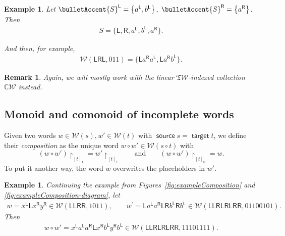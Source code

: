 \documentclass[pdftex]{sigma}
\renewcommand{\restriction}[2]{{#1\mathbin{\upharpoonright}_{#2}}}
\newcommand{\linearspan}[1]{{\CC #1}}
\newcommand{\SWc}{{\mathfrak{T}\mathcal{W}}}
\newcommand\IWc{\mathcal{W}}
\DeclareMathOperator{\source}{\mathsf{source}}
\DeclareMathOperator{\target}{\mathsf{target}}
\newcommand\LL{{\mathsf{L}}}
\newcommand\RR{{\mathsf{R}}}
\def\CC{\mathbb{C}}
\numberwithin{equation}{section}
\newtheorem{Example}[Theorem]{Example}
\newtheorem{Remark}[Theorem]{Remark}
\begin{document}
\begin{Example}
 Let $\bulletAccent{S}^{\LL} = \big\{a^\LL, b^\LL \big\}$, $\bulletAccent{S}^{\RR} = \big\{a^\RR\big\}$.
 Then
 \begin{align*}
 S = \big\{\LL,\RR,a^\LL,b^\LL,a^\RR\big\}.
 \end{align*}

 And then, for example,
 \begin{align*}
 \IWc( \LL\RR\LL,011 )
 =
 \big\{ \LL a^\RR a^\LL, \LL a^\RR b^\LL \big\}.
 \end{align*}
\end{Example}

\begin{Remark}
Again, we will mostly work with the linear $\SWc$-indexed collection $\linearspan{\IWc}$ instead.
\end{Remark}

\subsection{Monoid and comonoid of incomplete words}\label{ss:DmonoidDcomonoid}

Given two words $w\in\IWc{(s)},w'\in\IWc{(t)}$ with $\source s=\target t$, we define their \textit{composition} as the unique word $w\circ w'\in \IWc(s\circ t)$ with \[\restriction{(w\circ w')}{[t]_1}=\restriction{w'}{[t]_1} \qquad \text{and} \qquad \restriction{(w\circ w')}{[t]_0}=w.\] To put it another way, the word $w$ overwrites the placeholders in $w'$.

\begin{Example}
Continuing the example from Figures~\ref{fig:exampleComposition} and \ref{fig:exampleComposition-diagram}, let
	\begin{align*}
		w = x^\LL \LL x^\RR y^\RR \in \IWc(\LL\LL\RR\RR, 1011),\qquad
 w^{\prime}=\LL a^\LL a^\RR \LL\RR b^\LL \RR b^\LL
 \in \IWc(\LL\LL\RR\LL\RR\LL\RR\RR, 01100101).
	\end{align*}
	Then
	\begin{align*}
		w \circ w' = x^\LL a^\LL a^\RR \LL x^\RR b^\LL y^\RR b^\LL \in \IWc(\LL\LL\RR\LL\RR\LL\RR\RR, 11101111).
	\end{align*}
\end{Example}
\end{document}
